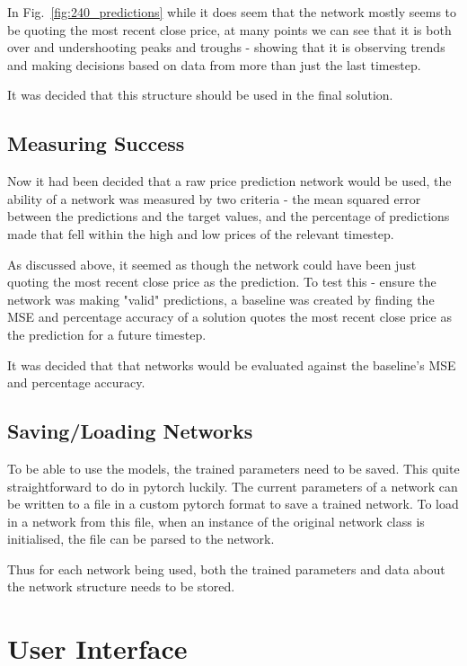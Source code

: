             In Fig.~\ref{fig:240_predictions} while it does seem that the network mostly seems to be quoting the most recent close price, at many points we can see that it is both over and undershooting peaks and troughs - showing that it is observing trends and making decisions based on data from more than just the last timestep.

            It was decided that this structure should be used in the final solution.


        \subsection{Measuring Success}

        Now it had been decided that a raw price prediction network would be used, the ability of a network was measured by two criteria - the mean squared error between the predictions and the target values, and the percentage of predictions made that fell within the high and low prices of the relevant timestep.

        As discussed above, it seemed as though the network could have been just quoting the most recent close price as the prediction. To test this - ensure the network was making "valid" predictions, a baseline was created by finding the MSE and percentage accuracy of a solution quotes the most recent close price as the prediction for a future timestep. 

        It was decided that that networks would be evaluated against the baseline's MSE and percentage accuracy.


        \subsection{Saving/Loading Networks}
        To be able to use the models, the trained parameters need to be saved. This quite straightforward to do in pytorch luckily. The current parameters of a network can be written to a file in a custom pytorch format to save a trained network. To load in a network from this file, when an instance of the original network class is initialised, the file can be parsed to the network. 
        
        Thus for each network being used, both the trained parameters and data about the network structure needs to be stored.


    \section{User Interface}

